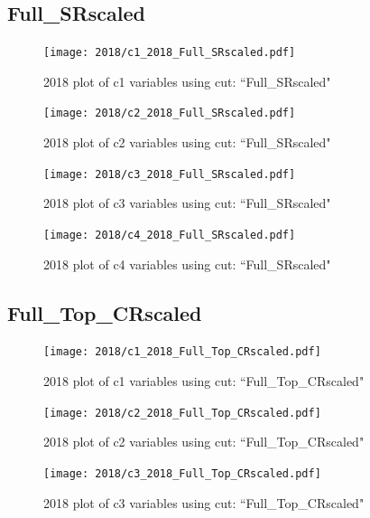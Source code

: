 \documentclass{article}
\begin{document}
      \subsection*{Full\_SRscaled}
                        \begin{figure}[H]
                            \centering
                            \caption{2018 plot of c1 variables using cut: ``Full\_SRscaled"}
                            \texttt{[image: 2018/c1\_2018\_Full\_SRscaled.pdf]}
                        \end{figure}    
                        \begin{figure}[H]
                            \centering
                            \caption{2018 plot of c2 variables using cut: ``Full\_SRscaled"}
                            \texttt{[image: 2018/c2\_2018\_Full\_SRscaled.pdf]}
                        \end{figure}    
                        \begin{figure}[H]
                            \centering
                            \caption{2018 plot of c3 variables using cut: ``Full\_SRscaled"}
                            \texttt{[image: 2018/c3\_2018\_Full\_SRscaled.pdf]}
                        \end{figure}    
                        \begin{figure}[H]
                            \centering
                            \caption{2018 plot of c4 variables using cut: ``Full\_SRscaled"}
                            \texttt{[image: 2018/c4\_2018\_Full\_SRscaled.pdf]}
                        \end{figure}    
      \subsection*{Full\_Top\_CRscaled}
                        \begin{figure}[H]
                            \centering
                            \caption{2018 plot of c1 variables using cut: ``Full\_Top\_CRscaled"}
                            \texttt{[image: 2018/c1\_2018\_Full\_Top\_CRscaled.pdf]}
                        \end{figure}    
                        \begin{figure}[H]
                            \centering
                            \caption{2018 plot of c2 variables using cut: ``Full\_Top\_CRscaled"}
                            \texttt{[image: 2018/c2\_2018\_Full\_Top\_CRscaled.pdf]}
                        \end{figure}    
                        \begin{figure}[H]
                            \centering
                            \caption{2018 plot of c3 variables using cut: ``Full\_Top\_CRscaled"}
                            \texttt{[image: 2018/c3\_2018\_Full\_Top\_CRscaled.pdf]}
                        \end{figure}    
\end{document}
